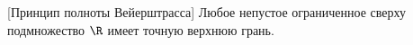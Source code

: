[Принцип полноты Вейерштрасса]
    Любое непустое ограниченное сверху подмножество $\R$ имеет точную верхнюю грань.
 
